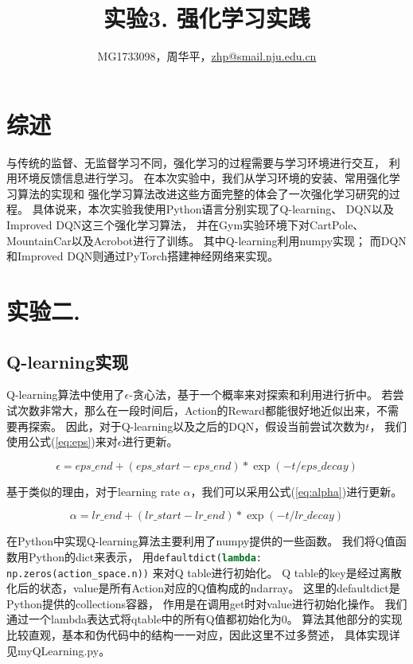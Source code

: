 \documentclass[a4paper,UTF8]{article}
\theoremstyle{definition}
\begin{document}
\title{实验3. 强化学习实践}
\author{MG1733098，周华平，\url{zhp@smail.nju.edu.cn}}
\maketitle

\section*{综述}

与传统的监督、无监督学习不同，强化学习的过程需要与学习环境进行交互，
利用环境反馈信息进行学习。
在本次实验中，我们从学习环境的安装、常用强化学习算法的实现和
强化学习算法改进这些方面完整的体会了一次强化学习研究的过程。
具体说来，本次实验我使用Python语言分别实现了Q-learning、
DQN以及Improved DQN这三个强化学习算法，
并在Gym实验环境下对CartPole、MountainCar以及Acrobot进行了训练。
其中Q-learning利用numpy实现；
而DQN和Improved DQN则通过PyTorch搭建神经网络来实现。

\section*{实验二.}

\subsection*{Q-learning实现}

Q-learning算法中使用了$\epsilon$-贪心法，基于一个概率来对探索和利用进行折中。
若尝试次数非常大，那么在一段时间后，Action的Reward都能很好地近似出来，不需要再探索。
因此，对于Q-learning以及之后的DQN，假设当前尝试次数为$t$，
我们使用公式(\ref{eq:eps})来对$\epsilon$进行更新。

\begin{equation}
	\label{eq:eps}
	\epsilon = eps\_end+(eps\_start-eps\_end)*\exp(-t/eps\_decay)
\end{equation}

基于类似的理由，对于learning rate $\alpha$，我们可以采用公式(\ref{eq:alpha})进行更新。

\begin{equation}
	\label{eq:alpha}
	\alpha = lr\_end+(lr\_start-lr\_end)*\exp(-t/lr\_decay)
\end{equation}

在Python中实现Q-learning算法主要利用了numpy提供的一些函数。
我们将Q值函数用Python的dict来表示，
用\lstinline[language=Python]{defaultdict(lambda: np.zeros(action_space.n))}
来对Q table进行初始化。
Q table的key是经过离散化后的状态，value是所有Action对应的Q值构成的ndarray。
这里的defaultdict是Python提供的collections容器，
作用是在调用get时对value进行初始化操作。
我们通过一个lambda表达式将qtable中的所有Q值都初始化为0。
算法其他部分的实现比较直观，基本和伪代码中的结构一一对应，因此这里不过多赘述，
具体实现详见myQLearning.py。
\end{document}
